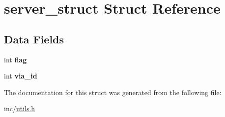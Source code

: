 \hypertarget{structserver__struct}{}\section{server\+\_\+struct Struct Reference}
\label{structserver__struct}
\subsection*{Data Fields}
\begin{DoxyCompactItemize}
\item 
int {\bfseries flag}\hypertarget{structserver__struct_adf916204820072417ed73a32de1cefcf}{}\label{structserver__struct_adf916204820072417ed73a32de1cefcf}

\item 
int {\bfseries via\+\_\+id}\hypertarget{structserver__struct_adee5b1f14180dba9741de853530e309a}{}\label{structserver__struct_adee5b1f14180dba9741de853530e309a}

\end{DoxyCompactItemize}


The documentation for this struct was generated from the following file\+:\begin{DoxyCompactItemize}
\item 
inc/\hyperlink{utils_8h}{utils.\+h}\end{DoxyCompactItemize}
